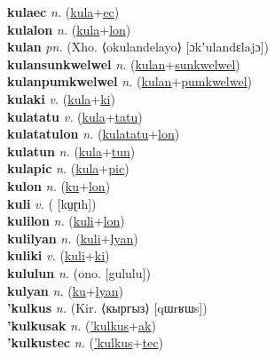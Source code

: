 \textbf{kulaec} \textit{n.} (\hyperref[kula]{kula}+\hyperref[ec]{ec})
 \label{kulaec} \\
\textbf{kulalon} \textit{n.} (\hyperref[kula]{kula}+\hyperref[lon]{lon})
 \label{kulalon} \\
\textbf{kulan} \textit{pn.} (Xho. ⟨okulandelayo⟩ [ɔkʼulandɛlajɔ])
 \label{kulan} \\
\textbf{kulansunkwelwel} \textit{n.} (\hyperref[kulan]{kulan}+\hyperref[sunkwelwel]{sunkwelwel})
 \label{kulansunkwelwel} \\
\textbf{kulanpumkwelwel} \textit{n.} (\hyperref[kulan]{kulan}+\hyperref[pumkwelwel]{pumkwelwel})
 \label{kulanpumkwelwel} \\
\textbf{kulaki} \textit{v.} (\hyperref[kula]{kula}+\hyperref[ki]{ki})
 \label{kulaki} \\
\textbf{kulatatu} \textit{v.} (\hyperref[kula]{kula}+\hyperref[tatu]{tatu})
 \label{kulatatu} \\
\textbf{kulatatulon} \textit{n.} (\hyperref[kulatatu]{kulatatu}+\hyperref[lon]{lon})
 \label{kulatatulon} \\
\textbf{kulatun} \textit{n.} (\hyperref[kula]{kula}+\hyperref[tun]{tun})
 \label{kulatun} \\
\textbf{kulapic} \textit{n.} (\hyperref[kula]{kula}+\hyperref[pic]{pic})
 \label{kulapic} \\
\textbf{kulon} \textit{n.} (\hyperref[ku]{ku}+\hyperref[lon]{lon})
 \label{kulon} \\
\textbf{kuli} \textit{v.} ( [kṳɽɪh])
 \label{kuli} \\
\textbf{kulilon} \textit{n.} (\hyperref[kuli]{kuli}+\hyperref[lon]{lon})
 \label{kulilon} \\
\textbf{kulilyan} \textit{n.} (\hyperref[kuli]{kuli}+\hyperref[lyan]{lyan})
 \label{kulilyan} \\
\textbf{kuliki} \textit{v.} (\hyperref[kuli]{kuli}+\hyperref[ki]{ki})
 \label{kuliki} \\
\textbf{kululun} \textit{n.} (ono. [gululu])
 \label{kululun} \\
\textbf{kulyan} \textit{n.} (\hyperref[ku]{ku}+\hyperref[lyan]{lyan})
 \label{kulyan} \\
\textbf{'kulkus} \textit{n.} (Kir. ⟨кыргыз⟩ [qɯrʁɯs])
 \label{'kulkus} \\
\textbf{'kulkusak} \textit{n.} (\hyperref['kulkus]{'kulkus}+\hyperref[ak]{ak})
 \label{'kulkusak} \\
\textbf{'kulkustec} \textit{n.} (\hyperref['kulkus]{'kulkus}+\hyperref[tec]{tec})
